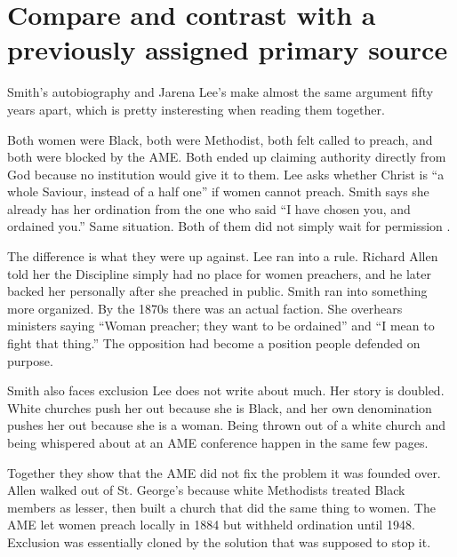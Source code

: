 \documentclass[12pt]{article}
\begin{document}
\section*{Compare and contrast with a previously assigned primary source}

Smith's autobiography and Jarena Lee's make almost the same argument fifty years apart, which is pretty insteresting when reading them together.

Both women were Black, both were Methodist, both felt called to preach, and both were blocked by the AME. Both ended up claiming authority directly from God because no institution would give it to them. Lee asks whether Christ is ``a whole Saviour, instead of a half one'' if women cannot preach. Smith says she already has her ordination from the one who said ``I have chosen you, and ordained you.'' Same situation. Both of them did not simply wait for permission .

The difference is what they were up against. Lee ran into a rule. Richard Allen told her the Discipline simply had no place for women preachers, and he later backed her personally after she preached in public. Smith ran into something more organized. By the 1870s there was an actual faction. She overhears ministers saying ``Woman preacher; they want to be ordained'' and ``I mean to fight that thing.'' The opposition had become a position people defended on purpose.

Smith also faces exclusion Lee does not write about much. Her story is doubled. White churches push her out because she is Black, and her own denomination pushes her out because she is a woman. Being thrown out of a white church and being whispered about at an AME conference happen in the same few pages.

Together they show that the AME did not fix the problem it was founded over. Allen walked out of St. George's because white Methodists treated Black members as lesser, then built a church that did the same thing to women. The AME let women preach locally in 1884 but withheld ordination until 1948. Exclusion was essentially cloned by the solution that was supposed to stop it.
\end{document}
